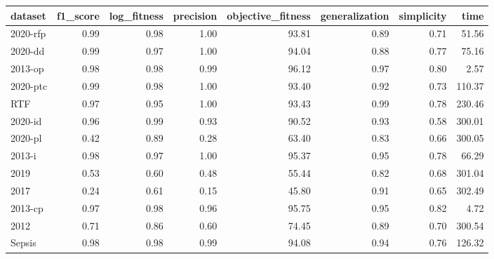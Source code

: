 \begin{tabular}{lrrrrrrr}
\toprule
dataset & f1_score & log_fitness & precision & objective_fitness & generalization & simplicity & time \\
\midrule
2020-rfp & 0.99 & 0.98 & 1.00 & 93.81 & 0.89 & 0.71 & 51.56 \\
2020-dd & 0.99 & 0.97 & 1.00 & 94.04 & 0.88 & 0.77 & 75.16 \\
2013-op & 0.98 & 0.98 & 0.99 & 96.12 & 0.97 & 0.80 & 2.57 \\
2020-ptc & 0.99 & 0.98 & 1.00 & 93.40 & 0.92 & 0.73 & 110.37 \\
RTF & 0.97 & 0.95 & 1.00 & 93.43 & 0.99 & 0.78 & 230.46 \\
2020-id & 0.96 & 0.99 & 0.93 & 90.52 & 0.93 & 0.58 & 300.01 \\
2020-pl & 0.42 & 0.89 & 0.28 & 63.40 & 0.83 & 0.66 & 300.05 \\
2013-i & 0.98 & 0.97 & 1.00 & 95.37 & 0.95 & 0.78 & 66.29 \\
2019 & 0.53 & 0.60 & 0.48 & 55.44 & 0.82 & 0.68 & 301.04 \\
2017 & 0.24 & 0.61 & 0.15 & 45.80 & 0.91 & 0.65 & 302.49 \\
2013-cp & 0.97 & 0.98 & 0.96 & 95.75 & 0.95 & 0.82 & 4.72 \\
2012 & 0.71 & 0.86 & 0.60 & 74.45 & 0.89 & 0.70 & 300.54 \\
Sepsis & 0.98 & 0.98 & 0.99 & 94.08 & 0.94 & 0.76 & 126.32 \\
\bottomrule
\end{tabular}
